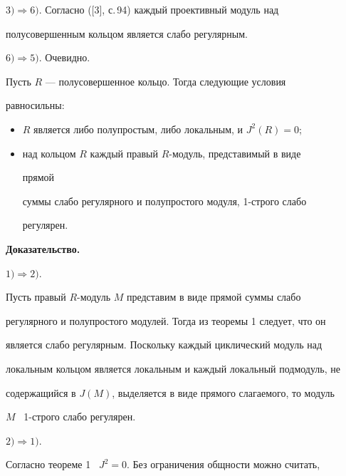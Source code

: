  


$3)\Rightarrow 6)$. Согласно ([3], с.\,94) каждый проективный модуль над 


полусовершенным кольцом является слабо регулярным. 


 


$6)\Rightarrow 5)$. Очевидно. 


 


\begin{cor} 


Пусть $R$ --- полусовершенное кольцо. Тогда следующие условия 


равносильны: 


\begin{itemize} 


\item[1)] $R$ является либо полупростым, либо локальным, и $J^2(R)=0$; 


\item[2)] над кольцом $R$ каждый правый $R$-модуль, представимый в виде 


прямой 


суммы слабо регулярного и полупростого модуля, 1-строго слабо 


регулярен. 


\end{itemize} 


\end{cor} 


 


 


{\bf Доказательство.} 


$1)\Rightarrow 2)$. 


Пусть правый $R$-модуль $M$ представим в виде прямой суммы слабо 


регулярного и полупростого модулей. Тогда из теоремы 1 следует, что он 


является слабо регулярным. Поскольку каждый циклический модуль над 


локальным кольцом является локальным и каждый локальный подмодуль, не 


содержащийся в $J(M)$, выделяется в виде прямого слагаемого, то модуль 


$M$ \ 1-строго слабо регулярен. 


 


$2)\Rightarrow 1)$. 


Согласно теореме 1 \ $J^2=0$. Без ограничения общности можно считать, 


